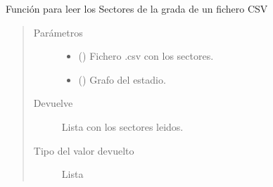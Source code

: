 \documentclass[letterpaper,10pt,spanish]{sphinxmanual}
\begin{document}

\begin{fulllineitems}
\label{\detokenize{Funciones:Funciones.leerSectoresCSV}}
\sphinxAtStartPar
Función para leer los Sectores de la grada de un fichero CSV
\begin{quote}\begin{description}
\item[{Parámetros}] \leavevmode\begin{itemize}
\item {} 
\sphinxAtStartPar
{} () \textendash{} Fichero .csv con los sectores.

\item {} 
\sphinxAtStartPar
{} () \textendash{} Grafo del estadio.

\end{itemize}

\item[{Devuelve}] \leavevmode
\sphinxAtStartPar
{} \textendash{} Lista con los sectores leidos.

\item[{Tipo del valor devuelto}] \leavevmode
\sphinxAtStartPar
Lista

\end{description}\end{quote}

\end{fulllineitems}

\end{document}
